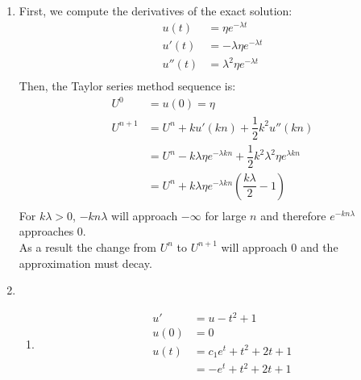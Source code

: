 \documentclass{article}
\begin{document}
\begin{enumerate}
    \item
        First, we compute the derivatives of the exact solution: \\
        \begin{equation*}
            \begin{split}
                u(t)  & = \eta e^{-\lambda t} \\
                u'(t) & = -\lambda \eta e^{-\lambda t} \\
                u''(t) & = \lambda^2 \eta e^{-\lambda t} \\
            \end{split}
        \end{equation*}
        Then, the Taylor series method sequence is: \\
        \begin{equation*}
            \begin{split}
                U^0     & = u(0) = \eta \\
                U^{n+1} & = U^n + ku'(kn) + \dfrac{1}{2}k^2u''(kn) \\
                        & = U^n - k\lambda \eta e^{-\lambda kn} + \dfrac{1}{2}k^2\lambda^2\eta e^{\lambda kn} \\
                        & = U^n + k\lambda \eta e^{-\lambda kn} \left( \dfrac{k\lambda}{2} - 1 \right) \\
            \end{split}
        \end{equation*}
        For $k\lambda > 0$, $-kn\lambda$ will approach $-\infty$ for large $n$ and therefore $e^{-kn\lambda}$ approaches $0$. \\
        As a result the change from $U^n$ to $U^{n+1}$ will approach $0$ and the approximation must decay. \\
    \item
        \begin{enumerate}
            \item
                \begin{equation*}
                    \begin{split}
                        u'   & = u - t^2 + 1 \\
                        u(0) & = 0 \\
                        u(t) & = c_1e^t + t^2 + 2t + 1 \\
                             & = -e^t + t^2 + 2t + 1 \\

\end{split}
\end{equation*}
\end{enumerate}
\end{enumerate}
\end{document}
